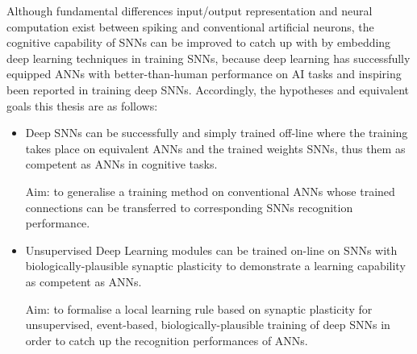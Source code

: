 Although fundamental differences \DIFdelbegin {}\DIFdelend \DIFaddbegin {}\DIFaddend input/output representation and neural computation exist between spiking and conventional artificial neurons, the cognitive capability of SNNs can be improved to catch up with \DIFdelbegin {}\DIFdelend \DIFaddbegin {}\DIFaddend by embedding deep learning techniques in training SNNs, because deep learning has successfully equipped ANNs with better-than-human performance on AI tasks and inspiring \DIFdelbegin {}\DIFdelend \DIFaddbegin {}\DIFaddend been reported in training deep SNNs.
Accordingly, the hypotheses and equivalent goals \DIFdelbegin {}\DIFdelend \DIFaddbegin {}\DIFaddend this thesis are as follows: 
\begin{itemize}
%

	\item 
	Deep SNNs can be successfully and simply trained off-line where the training takes place on equivalent ANNs and \DIFdelbegin {}\DIFdelend the trained weights \DIFdelbegin {}\DIFdelend \DIFaddbegin {}\DIFaddend SNNs, thus \DIFdelbegin {}\DIFdelend \DIFaddbegin {}\DIFaddend them as competent as ANNs in cognitive tasks. 

	Aim: to generalise a training method on conventional ANNs whose trained connections can be transferred to corresponding SNNs \DIFdelbegin {}\DIFdelend \DIFaddbegin {}\DIFaddend recognition performance.

	\item 
	Unsupervised Deep Learning modules can be trained on-line on SNNs with biologically-plausible synaptic plasticity to demonstrate a learning capability as competent as ANNs.

	Aim: to formalise a local learning rule based on synaptic plasticity for unsupervised, event-based, biologically-plausible training of deep SNNs in order to catch up \DIFaddbegin {}\DIFaddend the recognition performances of ANNs.


\end{itemize}
